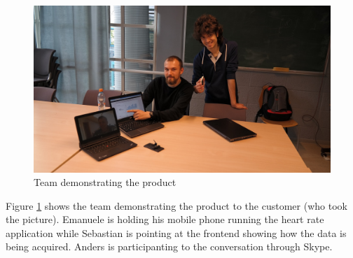 \begin{figure}[h]
\centering
\includegraphics[scale=0.33]{../Figures/demo-m1.jpg}
\caption{Team demonstrating the product}
\label{figure:demonstration-m1}
\end{figure}

Figure \ref{figure:demonstration-m1} shows the team demonstrating the product to the customer (who took the picture).
Emanuele is holding his mobile phone running the heart rate application while Sebastian is pointing at the frontend
showing how the data is being acquired. Anders is participanting to the conversation through Skype.



